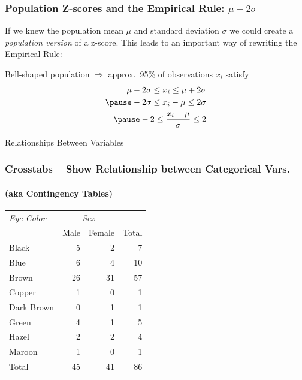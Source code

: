 \documentclass[handout]{beamer}
\begin{document}


\begin{frame}
\frametitle{Population Z-scores and the Empirical Rule: $\mu \pm 2\sigma$}
If we knew the population mean $\mu$ and standard deviation $\sigma$ we could create a \alert{\emph{population version}} of a z-score. This leads to an important way of rewriting the Empirical Rule:

\pause
\vspace{2em}
\alert{Bell-shaped population $\Rightarrow$ approx.\ 95\% of observations $x_i$ satisfy}
\begin{eqnarray*}
\mu - 2\sigma \leq x_i \leq \mu + 2\sigma\\\pause
-2 \sigma \leq x_i -\mu \leq 2\sigma\\\pause
-2 \leq \frac{x_i - \mu}{\sigma} \leq 2
\end{eqnarray*}


\end{frame}
\begin{frame}
\begin{center}
	\Huge Relationships Between Variables
\end{center}

\end{frame}

\begin{frame}
\frametitle{Crosstabs -- Show Relationship between Categorical Vars.}
\framesubtitle{(aka Contingency Tables)}
\begin{table}
\centering
\begin{tabular}{l|rr|r}
	\emph{Eye Color} & \multicolumn{2}{|c|}{\emph{Sex}}\\
	& Male & Female & Total\\
	\hline
	Black&5&2&7\\
	Blue&6&4&10\\
	Brown&26&31&57\\
	Copper&1&0&1\\
	Dark Brown&0&1&1\\
	Green&4&1&5\\
	Hazel&2&2&4\\
	Maroon&1&0&1\\
	\hline
	Total&45&41&86
\end{tabular}
\end{table}
\end{frame}
\end{document}
